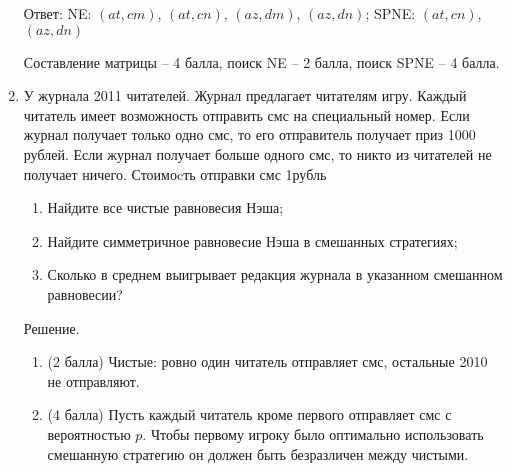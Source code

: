 \documentclass[pdftex,12pt,a4paper]{article}
\begin{document}
\begin{enumerate}

Ответ: NE: $(at,cm)$, $(at,cn)$, $(az,dm)$, $(az,dn)$;  SPNE: $(at,cn)$, $(az,dn)$ 


Составление матрицы -- 4 балла, поиск NE -- 2 балла, поиск SPNE -- 4 балла.

\item У журнала 2011 читателей. Журнал предлагает читателям игру. Каждый читатель имеет возможность отправить смс на специальный номер. Если журнал получает только одно смс, то его отправитель получает приз 1000 рублей. Если журнал получает больше одного смс, то никто из читателей не получает ничего. Стоимоcть отправки смс 1рубль
\begin{enumerate}
\item Найдите все чистые равновесия Нэша;
\item Найдите симметричное равновесие Нэша в смешанных стратегиях;
\item Сколько в среднем выигрывает редакция журнала в указанном смешанном равновесии?
\end{enumerate}
Решение.
\begin{enumerate}
\item (2 балла) Чистые: ровно один читатель отправляет смс, остальные 2010 не отправляют.
\item (4 балла) Пусть каждый читатель кроме первого отправляет смс с вероятностью $p$. Чтобы первому игроку было оптимально использовать смешанную стратегию он должен быть безразличен между чистыми.


\end{enumerate}
\end{enumerate}
\end{document}
